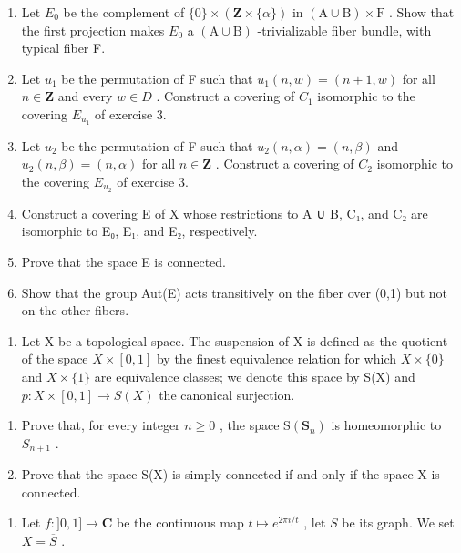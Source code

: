 \begin{enumerate}
\def\labelenumi{\alph{enumi})}
\item
  Let \(E_{0}\) be the complement of \(\{0\}\times(\mathbf{Z}\times\{\alpha\})\) in \((\mathrm{A}\cup\mathrm{B})\times\mathrm{F}\) . Show that the first projection makes \(E_{0}\) a \((\mathrm{A}\cup\mathrm{B})\) -trivializable fiber bundle, with typical fiber F.
\item
  Let \(u_{1}\) be the permutation of F such that \(u_{1}(n,w)=(n+1,w)\) for all \(n\in\mathbf{Z}\) and every \(w\in D\) . Construct a covering of \(C_{1}\) isomorphic to the covering \(E_{u_{1}}\) of exercise 3.
\item
  Let \(u_{2}\) be the permutation of F such that \(u_{2}(n,\alpha)=(n,\beta)\) and \(u_{2}(n,\beta)=(n,\alpha)\) for all \(n\in\mathbf{Z}\) . Construct a covering of \(C_{2}\) isomorphic to the covering \(E_{u_{2}}\) of exercise 3.
\item
  Construct a covering E of X whose restrictions to A ∪ B, C₁, and C₂ are isomorphic to E₀, E₁, and E₂, respectively.
\item
  Prove that the space E is connected.
\item
  Show that the group Aut(E) acts transitively on the fiber over (0,1) but not on the other fibers.
\end{enumerate}

\exercisegroup

\begin{enumerate}
\def\labelenumi{\arabic{enumi})}
\tightlist
\item
  Let X be a topological space. The suspension of X is defined as the quotient of the space \(X \times [0,1]\) by the finest equivalence relation for which \(X \times \{0\}\) and \(X \times \{1\}\) are equivalence classes; we denote this space by S(X) and \(p: X \times [0,1] \to S(X)\) the canonical surjection.
\end{enumerate}

\begin{enumerate}
\def\labelenumi{\alph{enumi})}
\item
  Prove that, for every integer \(n \geqslant 0\) , the space \(\mathrm{S}(\mathbf{S}_{n})\) is homeomorphic to \(S_{n+1}\) .
\item
  Prove that the space S(X) is simply connected if and only if the space X is connected.
\end{enumerate}

\begin{enumerate}
\def\labelenumi{\arabic{enumi})}
\setcounter{enumi}{1}
\tightlist
\item
  Let \(f: ]0,1] \to \mathbf{C}\) be the continuous map \(t \mapsto e^{2\pi i / t}\) , let \(S\) be its graph. We set \(X = \overline{S}\) .
\end{enumerate}

